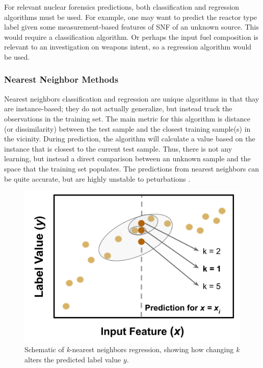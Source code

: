 \setlength\abovedisplayskip{2.5pt}

For relevant nuclear forensics predictions, both classification and regression
algorithms must be used.  For example, one may want to predict the reactor type
label given some measurement-based features of \gls{SNF} of an unknown source.
This would require a classification algorithm. Or perhaps the input fuel
composition is relevant to an investigation on weapons intent, so a regression
algorithm would be used. 

\subsubsection{Nearest Neighbor Methods}

Nearest neighbors classification and regression are unique algorithms in
that thay are instance-based; they do not actually generalize, but instead
track the observations in the training set.  The main metric for this algorithm
is distance (or dissimilarity) between the test sample and the closest training
sample(s) in the vicinity.  During prediction, the algorithm will calculate a
value based on the instance that is closest to the current test sample. Thus,
there is not any learning, but instead a direct comparison between an unknown
sample and the space that the training set populates. The predictions from
nearest neighbors can be quite accurate, but are highly unstable to
peturbations \cite{elements_stats}.

\begin{figure}[!htb]
  \centering
  \includegraphics[width=0.8\linewidth]{./chapters/litrev/nn-fig.png}
  \caption{Schematic of \textit{k}-nearest neighbors regression, showing how 
           changing \textit{k} alters the predicted label value $y$.}
  \label{fig:nn}
\end{figure}

